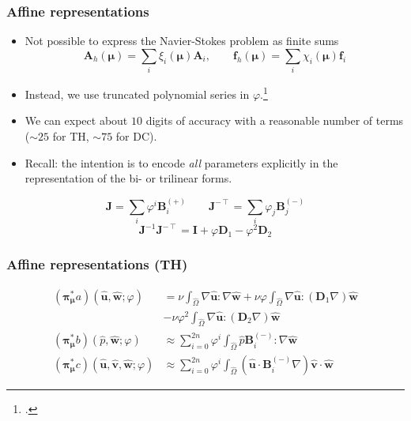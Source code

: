 \documentclass{beamer}
\begin{document}
\begin{frame}
  \frametitle{Affine representations}

  \begin{itemize}
  \item Not possible to express the Navier-Stokes problem as finite sums
    \[
      \bm A_h(\bm \mu) = \textstyle \sum_i \xi_i(\bm \mu) \bm A_i, \qquad
      \bm f_h(\bm \mu) = \textstyle \sum_i \chi_i(\bm \mu) \bm f_i
    \]
  \item Instead, we use truncated polynomial series in $\varphi$.\footcite{Fonn2018fdc}
  \item We can expect about $10$ digits of accuracy with a reasonable number of terms
    (${\sim}25$ for TH, ${\sim}75$ for DC).
  \item Recall: the intention is to encode \emph{all} parameters explicitly in the representation of
    the bi- or trilinear forms.
  \end{itemize}

  \[
    \bm J = \sum_i \varphi^i \bm B_i^{(+)}
    \qquad \bm J^{-\intercal} = \sum_i \varphi_j \bm B_j^{(-)}
  \]
  \[
    \bm J^{-1} \bm J^{-\intercal} = \bm I + \varphi \bm D_1 - \varphi^2 \bm D_2
  \]
\end{frame}

\begin{frame}
  \frametitle{Affine representations (TH)}
  \begin{align*}
    ({\bm\pi}^*_{\bm\mu}a)(\hat{\bm u}, \hat{\bm w}; \varphi) &=
    \nu \int_{\hat{\Omega}} \nabla \hat{\bm u} : \nabla \hat{\bm w}
    + \nu \varphi \int_{\hat{\Omega}}
    \nabla \hat{\bm u} : (\bm D_1 \nabla) \hat{\bm w} \\
    &- \nu \varphi^2 \int_{\hat{\Omega}}
    \nabla \hat{\bm u} : (\bm D_2 \nabla) \hat{\bm w} \\
    ({\bm\pi}^*_{\bm\mu}b)(\hat{p}, \hat{\bm w}; \varphi) &\approx \sum_{i=0}^{2n} \varphi^i
    \int_{\hat{\Omega}} \hat{p} \bm B^{(-)}_i : \nabla \hat{\bm w} \\
    ({\bm\pi}^*_{\bm\mu}c)(\hat{\bm u}, \hat{\bm v}, \hat{\bm w}; \varphi)
    &\approx \sum_{i=0}^{2n} \varphi^i \int_{\hat{\Omega}}
    (\hat{\bm u} \cdot \bm B^{(-)}_i \nabla) \hat{\bm v} \cdot \hat{\bm w}
  \end{align*}
\end{frame}
\end{document}
